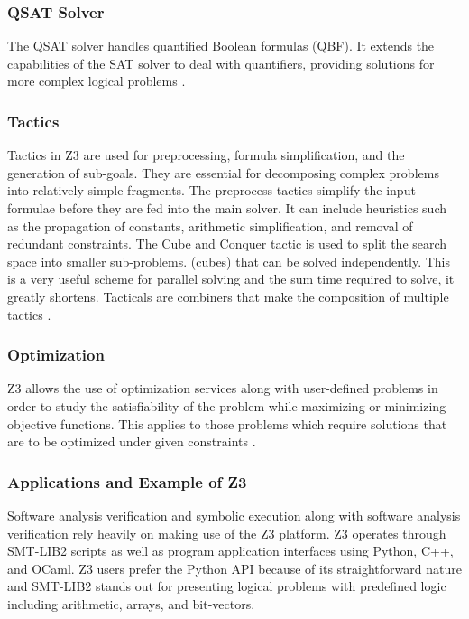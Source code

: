 \documentclass[]{rptuseminar}
\begin{document}
\subsubsection*{QSAT Solver}
The QSAT solver handles quantified Boolean formulas (QBF). It extends the capabilities of the SAT solver to deal with quantifiers, 
providing solutions for more complex logical problems \cite{nikolaj_bjorner_programming_nodate}.


\subsubsection{Tactics}
Tactics in Z3 are used for preprocessing, formula simplification, and the generation of sub-goals. They
are essential for decomposing complex problems into relatively simple fragments. The preprocess tactics simplify the input formulae before they are fed into the main solver.
 It can include heuristics such as the propagation of constants, arithmetic simplification, and removal of redundant constraints. The Cube and Conquer tactic is used to split
 the search space into smaller sub-problems. (cubes) that can be solved independently. This is a very useful scheme for parallel solving
and the sum time required to solve, it greatly shortens. Tacticals are combiners that make the composition of multiple tactics \cite{nikolaj_bjorner_programming_nodate}.
\subsubsection{Optimization}
Z3 allows the use of optimization services along with user-defined problems in order to study the satisfiability of the problem while maximizing or minimizing objective functions. This applies to those problems which require solutions that are to be optimized under given constraints \cite{nikolaj_bjorner_programming_nodate}.

\subsubsection{Applications and Example of Z3}
Software analysis verification and symbolic execution along with software analysis verification rely heavily 
on making use of the Z3 platform. Z3 operates through SMT-LIB2 scripts as well as program application interfaces 
using Python, C++, and OCaml. Z3 users prefer the Python API because of its 
straightforward nature and SMT-LIB2 stands out for presenting logical problems with predefined 
logic including arithmetic, arrays, and bit-vectors.
\vspace{1em}
\end{document}
